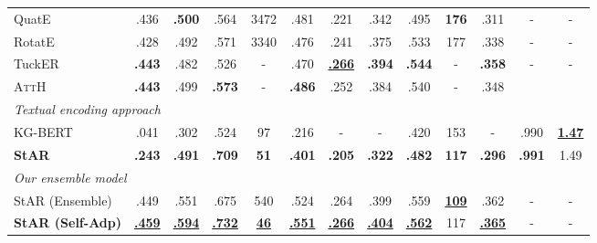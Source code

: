\documentclass[sigconf]{acmart}
\begin{document}
\begin{table*}[t]
\begin{tabular}{l|ccccc|ccccc|cc}
		QuatE \cite{QuatE} &.436 &\textbf{.500} &.564 &3472 &.481    &.221 &.342 &.495 &\textbf{176} &.311 &- &- \\
		RotatE \cite{sun2019rotate}      & .428   & {.492}   & .571          & 3340        & .476 & .241   & .375   & .533    &{177} & .338 & - & - \\
		TuckER \cite{balavzevic2019tucker}&\textbf{.443} &.482 &.526 &- &.470   &\underline{\textbf{.266}} &\textbf{.394} &\textbf{.544} &- &\textbf{.358} & - & - \\
		\textsc{AttH}\cite{Chami2020ATTH} &\textbf{.443} &.499 &\textbf{.573} &- &\textbf{.486}    &.252 &.384 &.540 &- &.348 \\

		\hline  \hline \hline
		\multicolumn{7}{l}{\textit{Textual encoding approach}}\\ \hline
		KG-BERT \cite{yao2019kgbert}     & .041      & .302      & .524          & 97          & .216    & -      & -      & .420    & 153 & - & .990 &\underline{\textbf{1.47}} \\
		\textbf{StAR} &\textbf{.243} &\textbf{.491} &\textbf{.709} &\textbf{51} &\textbf{.401}      &\textbf{.205} &\textbf{.322} &\textbf{.482} &\textbf{117} &\textbf{.296}   & \textbf{.991} & 1.49 \\ 
		\hline \hline \hline
		\multicolumn{13}{l}{\textit{Our ensemble model}}\\ \hline
 		StAR (Ensemble)  & .449  &.551   &.675   &540 &.524       &.264    &.399  &.559   & \underline{\textbf{109}}    &.362       & - & - \\
		\textbf{StAR (Self-Adp)} &\underline{\textbf{.459}} &\underline{\textbf{.594}} &\underline{\textbf{.732}} &\underline{\textbf{46}} &\underline{\textbf{.551}}   &\underline{\textbf{.266}} &\underline{\textbf{.404}} &\underline{\textbf{.562}}   & 117 &\underline{\textbf{.365}}   &- &- \\ \hline
	\end{tabular}
	\label{tab:main_results}
\end{table*}
\end{document}
